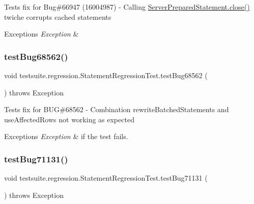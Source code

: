 Tests fix for Bug\#66947 (16004987) -\/ Calling \mbox{\hyperlink{classcom_1_1mysql_1_1jdbc_1_1_server_prepared_statement_a2d447ecd02f6f318e320d5c33ebfa780}{Server\+Prepared\+Statement.\+close()}} twiche corrupts cached statements


\begin{DoxyExceptions}{Exceptions}
{\em Exception} & \\
\hline
\end{DoxyExceptions}
\mbox{\label{classtestsuite_1_1regression_1_1_statement_regression_test_a98f77aa1cdaf8554dcfff5b368c4e90a}} 
\subsubsection{\texorpdfstring{test\+Bug68562()}{testBug68562()}}
{\footnotesize\ttfamily void testsuite.\+regression.\+Statement\+Regression\+Test.\+test\+Bug68562 (\begin{DoxyParamCaption}{ }\end{DoxyParamCaption}) throws Exception}

Tests fix for B\+UG\#68562 -\/ Combination rewrite\+Batched\+Statements and use\+Affected\+Rows not working as expected


\begin{DoxyExceptions}{Exceptions}
{\em Exception} & if the test fails. \\
\hline
\end{DoxyExceptions}
\mbox{\label{classtestsuite_1_1regression_1_1_statement_regression_test_a1e38b360b51a8f9704cef9040eb6a44d}} 
\subsubsection{\texorpdfstring{test\+Bug71131()}{testBug71131()}}
{\footnotesize\ttfamily void testsuite.\+regression.\+Statement\+Regression\+Test.\+test\+Bug71131 (\begin{DoxyParamCaption}{ }\end{DoxyParamCaption}) throws Exception}

